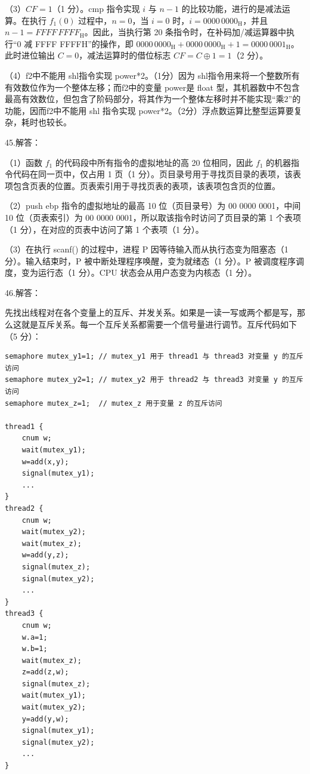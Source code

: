 \documentclass[UTF8,11pt]{ctexart}
\begin{document}
（3）\(\displaystyle CF=1\)（1 分）。cmp 指令实现 \(\displaystyle i\) 与 \(\displaystyle n-1\) 的比较功能，进行的是减法运算。在执行 \(\displaystyle f_1(0)\) 过程中，\(\displaystyle n=0\)，当 \(\displaystyle i=0\) 时，\(\displaystyle i=0000\,0000_{\mathrm H}\)，并且 \(\displaystyle n-1=FFFF\,FFFF_{\mathrm H}\)。因此，当执行第 20 条指令时，在补码加/减运算器中执行“0 减 FFFF FFFFH”的操作，即 \(\displaystyle 0000\,0000_{\mathrm H}+0000\,0000_{\mathrm H}+1=0000\,0001_{\mathrm H}\)。此时进位输出 \(\displaystyle C=0\)，减法运算时的借位标志 \(\displaystyle CF=C\oplus1=1\)（2 分）。


（4）f2中不能用 shl指令实现 power*2。（1分）因为 shl指令用来将一个整数所有有效数位作为一个整体左移；而f2中的变量 power是 float 型，其机器数中不包含最高有效数位，但包含了阶码部分，将其作为一个整体左移时并不能实现“乘2”的功能，因而f2中不能用 shl 指令实现 power*2。（2分）浮点数运算比整型运算要复杂，耗时也较长。


45.解答：


（1）函数 \(\displaystyle f_1\) 的代码段中所有指令的虚拟地址的高 20 位相同，因此 \(\displaystyle f_1\) 的机器指令代码在同一页中，仅占用 1 页（1 分）。页目录号用于寻找页目录的表项，该表项包含页表的位置。页表索引用于寻找页表的表项，该表项包含页的位置。


（2）push ebp 指令的虚拟地址的最高 10 位（页目录号）为 00 0000 0001，中间 10 位（页表索引）为 00 0000 0001，所以取该指令时访问了页目录的第 1 个表项（1 分），在对应的页表中访问了第 1 个表项（1 分）。


（3）在执行 scanf() 的过程中，进程 P 因等待输入而从执行态变为阻塞态（1 分）。输入结束时，P 被中断处理程序唤醒，变为就绪态（1 分）。P 被调度程序调度，变为运行态（1 分）。CPU 状态会从用户态变为内核态（1 分）。


46.解答：


先找出线程对在各个变量上的互斥、并发关系。如果是一读一写或两个都是写，那么这就是互斥关系。每一个互斥关系都需要一个信号量进行调节。互斥代码如下（5 分）：


\begin{Verbatim}[breaklines,breakanywhere,fontsize=\small]
semaphore mutex_y1=1; // mutex_y1 用于 thread1 与 thread3 对变量 y 的互斥访问
semaphore mutex_y2=1; // mutex_y2 用于 thread2 与 thread3 对变量 y 的互斥访问
semaphore mutex_z=1;  // mutex_z 用于变量 z 的互斥访问

thread1 {
    cnum w;
    wait(mutex_y1);
    w=add(x,y);
    signal(mutex_y1);
    ...
}
thread2 {
    cnum w;
    wait(mutex_y2);
    wait(mutex_z);
    w=add(y,z);
    signal(mutex_z);
    signal(mutex_y2);
    ...
}
thread3 {
    cnum w;
    w.a=1;
    w.b=1;
    wait(mutex_z);
    z=add(z,w);
    signal(mutex_z);
    wait(mutex_y1);
    wait(mutex_y2);
    y=add(y,w);
    signal(mutex_y1);
    signal(mutex_y2);
    ...
}

\end{Verbatim}
\end{document}
